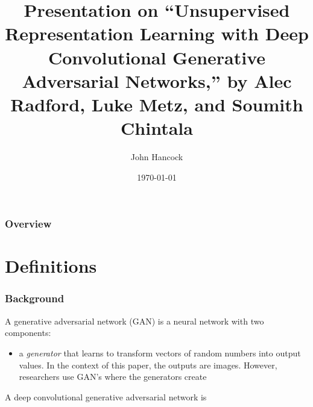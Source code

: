 \documentclass{beamer}
\title[Unsupervised Representation Learning with Deep Convolutional
Generative Adversarial Networks]{Presentation on ``Unsupervised Representation 
Learning with Deep Convolutional Generative Adversarial Networks,'' by Alec Radford, Luke Metz, and Soumith Chintala} %
\author{John Hancock} %
\institute[FAU] %
{
Florida Atlantic University \\ %
\medskip
\textit{jhancoc4@fau.edu} %
}
\date{\today} %
\begin{document}
\begin{frame}
\titlepage %
\end{frame}

\begin{frame}
\frametitle{Overview} %
\tableofcontents %
\end{frame}


\section{Definitions} %

\begin{frame}
\frametitle{Background}
A generative adversarial network (GAN) is a neural network with two components:
\begin{itemize}
  \item a \textit{generator} that learns to transform vectors of random numbers into
    output values.  In the context of this paper, the outputs are images.  However, 
   researchers use GAN's where the generators create 
\end{itemize}
A deep convolutional generative adversarial network is
\end{frame}

\end{document}
